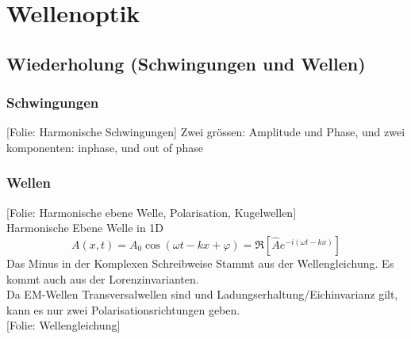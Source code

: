 \documentclass[titlepage,11pt,a4paper,ngerman]{report}
\newcommand{\folie}[1]{\color{gray}[Folie: #1]\color{black}}
\newcommand{\lcom}[1]{\color{MidnightBlue}#1\color{black}}
\begin{document}
\chapter{Wellenoptik}
\section{Wiederholung (Schwingungen und Wellen)}
\subsection{Schwingungen}
\folie{Harmonische Schwingungen}
\lcom{Zwei grössen: Amplitude und Phase, und zwei komponenten: inphase, und out of phase}
\subsection{Wellen}
\folie{Harmonische ebene Welle, Polarisation, Kugelwellen}\\
Harmonische Ebene Welle in 1D
\begin{equation*}
A(x,t) = A_0 \cos (\omega t - kx + \varphi)= \Re\left[\hat{A} e^{-i(\omega t - kx)}\right]
\end{equation*}
\lcom{Das Minus in der Komplexen Schreibweise Stammt aus der Wellengleichung. Es kommt auch aus der Lorenzinvarianten. }\\
\lcom{Da EM-Wellen Transversalwellen sind und Ladungserhaltung/Eichinvarianz gilt, kann es nur zwei Polarisationsrichtungen geben. }\\
\folie{Wellengleichung}
\end{document}
